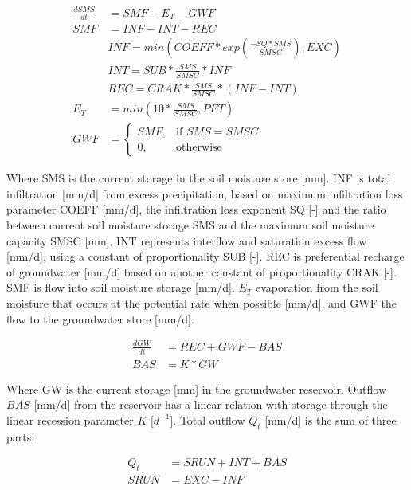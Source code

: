 \begin{align}
	\frac{dSMS}{dt} &= SMF-E_T-GWF\\
	SMF &= INF-INT-REC\\
		&INF = min\left(COEFF * exp\left(\frac{-SQ*SMS}{SMSC}\right),EXC\right)\\
		&INT = SUB*\frac{SMS}{SMSC} * INF \\
		&REC = CRAK*\frac{SMS}{SMSC}*(INF-INT)\\
	E_T &=min\left(10*\frac{SMS}{SMSC},PET\right)\\
	GWF &= \begin{cases}
		SMF, &\text{if } SMS = SMSC\\
		0, &\text{otherwise}
	\end{cases}
\end{align}

Where SMS is the current storage in the soil moisture store [mm]. INF is total infiltration [mm/d] from excess precipitation, based on maximum infiltration loss parameter COEFF [mm/d], the infiltration loss exponent SQ [-] and the ratio between current soil moisture storage SMS and the maximum soil moisture capacity SMSC [mm]. INT represents interflow and saturation excess flow [mm/d], using a constant of proportionality SUB [-]. REC is preferential recharge of groundwater [mm/d] based on another constant of proportionality CRAK [-]. SMF is flow into soil moisture storage [mm/d]. $E_T$ evaporation from the soil moisture that occurs at the potential rate when possible [mm/d], and GWF the flow to the groundwater store [mm/d]:

\begin{align}
	\frac{dGW}{dt} &= REC+GWF - BAS\\
	BAS &= K * GW 
\end{align}

Where GW is the current storage [mm] in the groundwater reservoir. Outflow $BAS$ [mm/d] from the reservoir has a linear relation with storage through the linear recession parameter $K$ [$d^{-1}$]. Total outflow $Q_t$ [mm/d] is the sum of three parts:

\begin{align}
	Q_t &= SRUN+INT+BAS\\
	SRUN &= EXC-INF
\end{align}

\newpage
